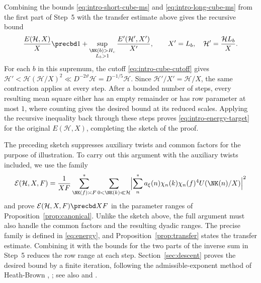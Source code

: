Combining the bounds \eqref{eq:intro-short-cube-ms} and
\eqref{eq:intro-long-cube-ms} from the first part of Step~5 with
the transfer estimate above gives the recursive bound
\[
 \frac{E(\mathcal H,X)}{X}
 \precbd 1+\sup_{\substack{\NK(b)>H_c\\L_b>1}}\frac{E'(\mathcal H',X')}{X'},
 \qquad X'=L_b,\quad \mathcal H'=\frac{\mathcal H L_b}{X}.
\]
For each $b$ in this supremum, the cutoff \eqref{eq:intro-cube-cutoff}
gives $\mathcal H'<\mathcal H(\mathcal H/X)^2
\ll D^{-2\vartheta}\mathcal H=D^{-1/5}\mathcal H$.
Since $\mathcal H'/X'=\mathcal H/X$, the same contraction applies
at every step. After a bounded number of steps, every resulting mean
square either has an empty remainder or has row parameter at most $1$,
where counting gives the desired bound at its reduced scales.
Applying the recursive inequality back through these steps proves
\eqref{eq:intro-energy-target} for the original $E(\mathcal H,X)$,
completing the sketch of the proof.

The preceding sketch suppresses auxiliary twists and common factors for the purpose of illustration. To carry out this argument with the auxiliary twists included, we use the family
\[
 \mathcal E(\mathcal H,X,F)
 =\frac1{XF}\sum_{\NK(f)\asymp F}^*
   \sum_{0<\NK(k)\ll\mathcal H}
 \Bigl|\sum_n^*a_\xi(n)\chi_n(k)\chi_n(f)^4
                      U(\NK(n)/X)\Bigr|^2
\]
and prove $\mathcal E(\mathcal H,X,F)\precbd XF$ in the parameter
ranges of Proposition~\ref{prop:canonical}. Unlike the sketch above, the full
argument must also handle the common factors and the resulting dyadic
ranges.
The precise family is defined in \eqref{eq:energy}, and
Proposition~\ref{prop:transfer} states the transfer estimate.
Combining it with the bounds for the two parts of
the inverse sum in Step~5 reduces the row range at each step.
Section~\ref{sec:descent} proves the desired bound by a finite iteration,
following the admissible-exponent method of Heath-Brown
\cite[Lemma~8 and \S8]{HB95}, \cite[Lemma~9]{HB00}; see also
\cite[Theorem~4.1]{GL} and \cite[\S3.2]{BGL}.

